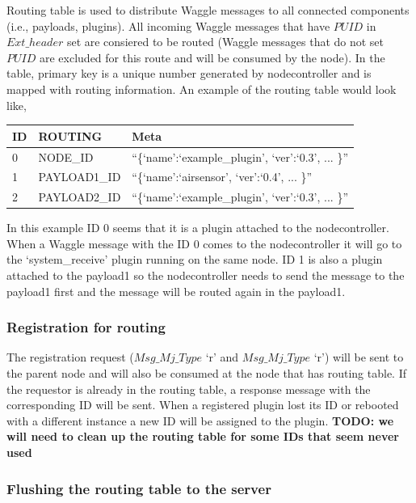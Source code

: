 \noindent
Routing table is used to distribute Waggle messages to all connected components (i.e., payloads, plugins). All incoming Waggle messages 
that have $PUID$ in $Ext\_header$ set are consiered to be routed (Waggle messages that do not set $PUID$ are excluded for this route and will be 
consumed by the node). In the table, primary key is a unique number generated by nodecontroller and is mapped with routing information. An example of the 
routing table would look like,

\begin{center}
    \begin{tabular}{ | p{2cm} | p{3cm} | p{8cm} |}
    \hline
    \hline
    \textbf{ID} & \textbf{ROUTING} & \textbf{Meta} \\ \hline \hline
    0 & NODE\_ID & ``\{`name':`example\_plugin', `ver':`0.3', ... \}'' \\  \hline
    1 & PAYLOAD1\_ID & ``\{`name':`airsensor', `ver':`0.4', ... \}'' \\  \hline
    2 & PAYLOAD2\_ID & ``\{`name':`example\_plugin', `ver':`0.3', ... \}'' \\  \hline
    \end{tabular}
\end{center}

In this example ID 0 seems that it is a plugin attached to the nodecontroller. When a Waggle message with the ID 0 comes to the nodecontroller it will go to 
the `system\_receive' plugin running on the same node. ID 1 is also a plugin attached to the payload1 so the nodecontroller needs to send the message to the 
payload1 first and the message will be routed again in the payload1.

\subsubsection{Registration for routing}

The registration request ($Msg\_Mj\_Type$ `r' and $Msg\_Mj\_Type$ `r') will be sent to the parent node and will also be consumed at the node that has routing 
table. If the requestor is already in the routing table, a response message with the corresponding ID will be sent. When a registered plugin lost its 
ID or rebooted with a different instance a new ID will be assigned to the plugin. \textbf{TODO: we will need to clean up the routing table for some IDs that 
seem never used}

\subsubsection{Flushing the routing table to the server}

